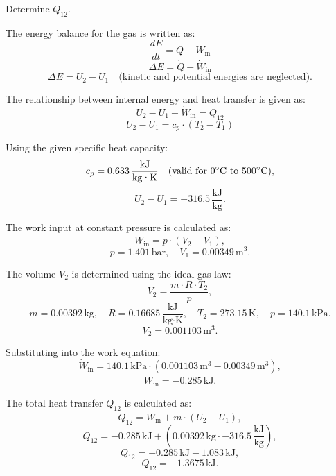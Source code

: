 Determine \( Q_{12} \).

The energy balance for the gas is written as:  
\[
\frac{dE}{dt} = \dot{Q} - \dot{W}_{\text{in}}
\]  
\[
\Delta E = \dot{Q} - \dot{W}_{\text{in}}
\]  
\[
\Delta E = U_2 - U_1 \quad \text{(kinetic and potential energies are neglected).}
\]

The relationship between internal energy and heat transfer is given as:  
\[
U_2 - U_1 + \dot{W}_{\text{in}} = Q_{12}
\]  
\[
U_2 - U_1 = c_p \cdot (T_2 - T_1)
\]

Using the given specific heat capacity:  
\[
c_p = 0.633 \, \frac{\text{kJ}}{\text{kg·K}} \quad \text{(valid for \( 0^\circ\text{C} \) to \( 500^\circ\text{C} \))},
\]  
\[
U_2 - U_1 = -316.5 \, \frac{\text{kJ}}{\text{kg}}.
\]

The work input at constant pressure is calculated as:  
\[
\dot{W}_{\text{in}} = p \cdot (V_2 - V_1),
\]  
\[
p = 1.401 \, \text{bar}, \quad V_1 = 0.00349 \, \text{m}^3.
\]

The volume \( V_2 \) is determined using the ideal gas law:  
\[
V_2 = \frac{m \cdot R \cdot T_2}{p},
\]  
\[
m = 0.00392 \, \text{kg}, \quad R = 0.16685 \, \frac{\text{kJ}}{\text{kg·K}}, \quad T_2 = 273.15 \, \text{K}, \quad p = 140.1 \, \text{kPa}.
\]  
\[
V_2 = 0.001103 \, \text{m}^3.
\]

Substituting into the work equation:  
\[
\dot{W}_{\text{in}} = 140.1 \, \text{kPa} \cdot (0.001103 \, \text{m}^3 - 0.00349 \, \text{m}^3),
\]  
\[
\dot{W}_{\text{in}} = -0.285 \, \text{kJ}.
\]

The total heat transfer \( Q_{12} \) is calculated as:  
\[
Q_{12} = \dot{W}_{\text{in}} + m \cdot (U_2 - U_1),
\]  
\[
Q_{12} = -0.285 \, \text{kJ} + (0.00392 \, \text{kg} \cdot -316.5 \, \frac{\text{kJ}}{\text{kg}}),
\]  
\[
Q_{12} = -0.285 \, \text{kJ} - 1.083 \, \text{kJ},
\]  
\[
Q_{12} = -1.3675 \, \text{kJ}.
\]
